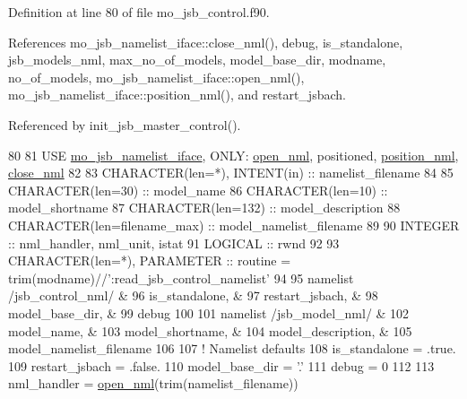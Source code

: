 Definition at line 80 of file mo\+\_\+jsb\+\_\+control.\+f90.



References mo\+\_\+jsb\+\_\+namelist\+\_\+iface\+::close\+\_\+nml(), debug, is\+\_\+standalone, jsb\+\_\+models\+\_\+nml, max\+\_\+no\+\_\+of\+\_\+models, model\+\_\+base\+\_\+dir, modname, no\+\_\+of\+\_\+models, mo\+\_\+jsb\+\_\+namelist\+\_\+iface\+::open\+\_\+nml(), mo\+\_\+jsb\+\_\+namelist\+\_\+iface\+::position\+\_\+nml(), and restart\+\_\+jsbach.



Referenced by init\+\_\+jsb\+\_\+master\+\_\+control().


\begin{DoxyCode}
80 
81     \textcolor{keywordtype}{USE }\hyperlink{namespacemo__jsb__namelist__iface}{mo\_jsb\_namelist\_iface}\textcolor{keywordtype}{, ONLY}: \hyperlink{namespacemo__jsb__namelist__iface_abb2821ffd4c30375faa307d522af3bcb}{open\_nml}, positioned, 
      \hyperlink{namespacemo__jsb__namelist__iface_a4d29dc192b429a0c5f11ecd7d7f637e9}{position\_nml}, \hyperlink{namespacemo__jsb__namelist__iface_a240047c255ab5bb3871ecdcdcd6d6a92}{close\_nml}
82 
83     \textcolor{keywordtype}{CHARACTER(len=*)}, \textcolor{keywordtype}{INTENT(in)} :: namelist\_filename
84 
85     \textcolor{keywordtype}{CHARACTER(len=30)}  :: model\_name
86     \textcolor{keywordtype}{CHARACTER(len=10)}  :: model\_shortname
87     \textcolor{keywordtype}{CHARACTER(len=132)} :: model\_description
88     \textcolor{keywordtype}{CHARACTER(len=filename\_max)} :: model\_namelist\_filename
89 
90     \textcolor{keywordtype}{INTEGER} :: nml\_handler, nml\_unit, istat
91     \textcolor{keywordtype}{LOGICAL} :: rwnd
92 
93     \textcolor{keywordtype}{CHARACTER(len=*)}, \textcolor{keywordtype}{PARAMETER} :: routine = trim(modname)//\textcolor{stringliteral}{':read\_jsb\_control\_namelist'}
94 
95     namelist /jsb\_control\_nml/ &
96       is\_standalone,           &
97       restart\_jsbach,          &
98       model\_base\_dir,          &
99       debug
100 
101     namelist /jsb\_model\_nml/   &
102       model\_name,              &
103       model\_shortname,         &
104       model\_description,       &
105       model\_namelist\_filename
106 
107     \textcolor{comment}{! Namelist defaults}
108     is\_standalone  = .true.
109     restart\_jsbach = .false.
110     model\_base\_dir = \textcolor{stringliteral}{'.'}
111     debug          = 0
112 
113     nml\_handler = \hyperlink{namespacemo__jsb__namelist__iface_abb2821ffd4c30375faa307d522af3bcb}{open\_nml}(trim(namelist\_filename))

\end{DoxyCode}
